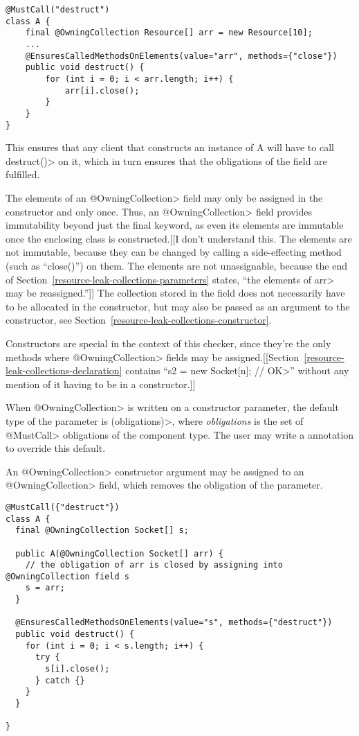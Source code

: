 \begin{verbatim}
@MustCall("destruct")
class A {
    final @OwningCollection Resource[] arr = new Resource[10];
    ...
    @EnsuresCalledMethodsOnElements(value="arr", methods={"close"})
    public void destruct() {
        for (int i = 0; i < arr.length; i++) {
            arr[i].close();
        }
    }
}
\end{verbatim}

This ensures that any client that constructs an instance of A will have to call \<destruct()> on it, which in turn ensures that the obligations of the field are fulfilled.

The elements of an \<@OwningCollection> field may only be assigned in the
constructor and only once. Thus, an \<@OwningCollection> field provides
immutability beyond just the final keyword, as even its elements are immutable
once the enclosing class is constructed.[[I don't understand this.  The elements
are not immutable, because they can be changed by calling a side-effecting
method (such as ``close()'') on them.  The elements are not unassignable,
because the end of Section~\ref{resource-leak-collections-parameters} states,
``the elements of \<arr> may be reassigned.'']]  The collection stored in the
field does not necessarily have to be allocated in the constructor, but may also
be passed as an argument to the constructor, see
Section~\ref{resource-leak-collections-constructor}.



Constructors are special in the context of this checker, since they're the
only methods where \<@OwningCollection> fields may be
assigned.[[Section~\ref{resource-leak-collections-declaration} contains
``\<s2 = new Socket[n]; // OK>'' without any mention of it having to be in a constructor.]]

When \<@OwningCollection> is written on a constructor parameter, the
default type of the parameter is \MustCallOnElements\<(obligations)>, where
\textit{obligations} is the set of \<@MustCall> obligations of the
component type. The user may write a \MustCallOnElements annotation to override this default.

An \<@OwningCollection> constructor argument may be assigned to an \<@OwningCollection> field, which removes the obligation of the parameter.

\begin{verbatim}
@MustCall({"destruct"})
class A {
  final @OwningCollection Socket[] s;

  public A(@OwningCollection Socket[] arr) {
    // the obligation of arr is closed by assigning into @OwningCollection field s
    s = arr;
  }

  @EnsuresCalledMethodsOnElements(value="s", methods={"destruct"})
  public void destruct() {
    for (int i = 0; i < s.length; i++) {
      try {
        s[i].close();
      } catch {}
    }
  }

}
\end{verbatim}


